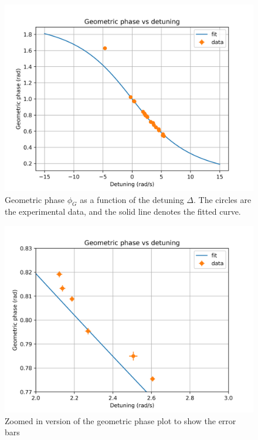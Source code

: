 \begin{figure}[H]
	\centering
	\includegraphics[scale=0.4]{Geometric_phase.png}
	\caption{Geometric phase $ \phi_{G} $ as a function of the detuning $ \Delta $. The circles are the
		experimental data, and the solid line denotes the fitted curve. }
	\label{fig:first_sq}
\end{figure}

\begin{figure}[H]
	\centering
	\includegraphics[scale=0.4]{Zoomed_in_geometric_phase.png}
	\caption{Zoomed in version of the geometric phase plot to show the error bars}
	\label{fig:first_sq}
\end{figure}
\setcounter{equation}{0}
\setcounter{table}{0}
\setcounter{figure}{0}
